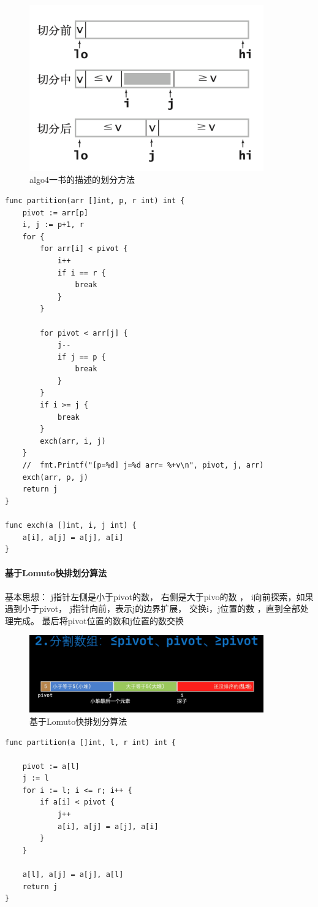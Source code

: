 \newpage
\begin{figure}
\label{Fig.algo_qsort}
\includegraphics[width=0.9\textwidth]{./images/quicksort_partiton_algo4.png}
\caption{algo4一书的描述的划分方法}
\end{figure}
\begin{lstlisting}
func partition(arr []int, p, r int) int {
	pivot := arr[p]
	i, j := p+1, r
	for {
		for arr[i] < pivot {
			i++
			if i == r {
				break
			}
		}
		
		for pivot < arr[j] {
			j--
			if j == p {
				break
			}
		}
		if i >= j {
			break
		}
		exch(arr, i, j)
	}
	//	fmt.Printf("[p=%d] j=%d arr= %+v\n", pivot, j, arr)
	exch(arr, p, j)
	return j
}

func exch(a []int, i, j int) {
	a[i], a[j] = a[j], a[i]
}

\end{lstlisting}

\paragraph{基于Lomuto快排划分算法}
基本思想： j指针左侧是小于pivot的数， 右侧是大于pivo的数 ， i向前探索，如果遇到小于pivot， j指针向前，表示j的边界扩展，  交换i，j位置的数 ，直到全部处理完成。 最后将pivot位置的数和j位置的数交换


\begin{figure}
	\centering
	\includegraphics[width=0.9\textwidth]{./images/lomuto_qsort_think.png}
	\caption{基于Lomuto快排划分算法}
\end{figure}
\begin{lstlisting}
func partition(a []int, l, r int) int {
	
	pivot := a[l]
	j := l
	for i := l; i <= r; i++ {
		if a[i] < pivot {
			j++
			a[i], a[j] = a[j], a[i]
		}
	}
	
	a[l], a[j] = a[j], a[l]
	return j
}
\end{lstlisting}


